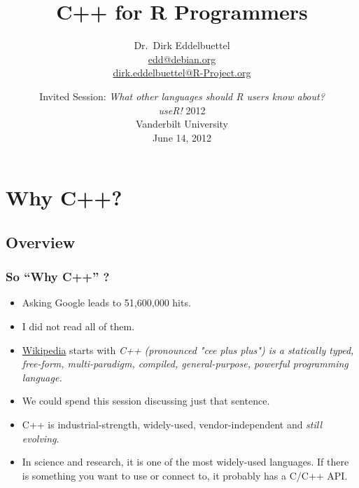 \documentclass[handout,compress,dvipsnames,pdflatex,beamer]{beamer}
\title[C++ for R Programmers]{C++ for R Programmers}
\author[Dirk Eddelbuettel]{Dr.~Dirk Eddelbuettel\\ \scriptsize\url{edd@debian.org}\\ \url{dirk.eddelbuettel@R-Project.org}}
\date[useR! 2012 @ Vanderbilt]{
  { \small 
    Invited Session: 
    \textsl{What other languages should R users know about?}}\\[20pt] 
  \textsl{useR!} 2012\\ Vanderbilt University \\
  June 14, 2012  }
\begin{document}



\section[C++?]{Why C++?}
\subsection{Overview}
\begin{frame}
  \frametitle{So ``Why C++'' ?}
  
  \begin{itemize}
  \item Asking Google leads to 51,600,000 hits.
  \item I did not read all of them.
  \item \href{http://en.wikipedia.org/wiki/C\%2B\%2B}{Wikipedia} starts with
    \emph{C++ (pronounced "cee plus plus") is a statically typed,
      free-form, multi-paradigm, compiled, general-purpose, powerful
      programming language.}  
  \item We could spend this session discussing just that sentence.
  \item C++ is industrial-strength, widely-used, vendor-independent and
    \emph{still evolving}.
  \item In science and research, it is one of the most widely-used
    languages.  If there is something you want to use or connect to, it
    probably has a C/C++ API.
  \end{itemize}
\end{frame}
\end{document}
